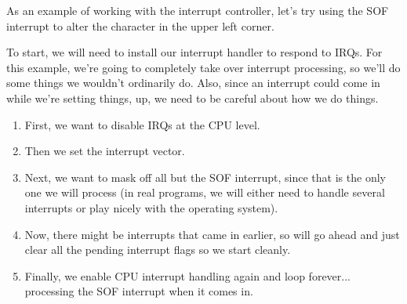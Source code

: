As an example of working with the interrupt controller, let’s try using the SOF interrupt to alter the character in the upper left corner.

To start, we will need to install our interrupt handler to respond to IRQs. For this example, we’re going to completely take over interrupt processing, so we’ll do some things we wouldn’t ordinarily do. Also, since an interrupt could come in while we’re setting things, up, we need to be careful about how we do things.

\begin{enumerate}
    \item First, we want to disable IRQs at the CPU level.
    \item Then we set the interrupt vector.
    \item Next, we want to mask off all but the SOF interrupt, since that is the only one we will process (in real programs, we will either need to handle several interrupts or play nicely with the operating system).
    \item Now, there might be interrupts that came in earlier, so will go ahead and just clear all the pending interrupt flags so we start cleanly.
    \item Finally, we enable CPU interrupt handling again and loop forever... processing the SOF interrupt when it comes in.
\end{enumerate}

